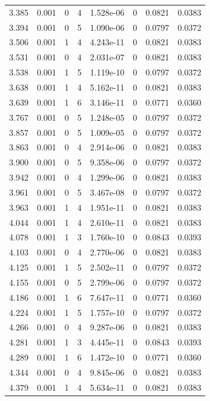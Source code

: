 \documentclass[preview]{standalone}
\begin{document}
{{{\begin{tabular}{L{1.2cm}C{1.2cm} C{0.3cm}C{0.5cm} C{1.4cm}C{1.4cm} C{1.4cm}C{1.4cm}}
  3.385  &  0.001  & 0     &  4 &  1.528e-06  & 0  & 0.0821 &  0.0383   \\ 
  3.394  &  0.001  & 0     &  5 &  1.090e-06  & 0  & 0.0797 &  0.0372   \\ 
  3.506  &  0.001  & 1     &  4 &  4.243e-11  & 0  & 0.0821 &  0.0383   \\ 
  3.531  &  0.001  & 0     &  4 &  2.031e-07  & 0  & 0.0821 &  0.0383   \\ 
  3.538  &  0.001  & 1     &  5 &  1.119e-10  & 0  & 0.0797 &  0.0372   \\ 
  3.638  &  0.001  & 1     &  4 &  5.162e-11  & 0  & 0.0821 &  0.0383   \\ 
  3.639  &  0.001  & 1     &  6 &  3.146e-11  & 0  & 0.0771 &  0.0360   \\ 
  3.767  &  0.001  & 0     &  5 &  1.248e-05  & 0  & 0.0797 &  0.0372   \\ 
  3.857  &  0.001  & 0     &  5 &  1.009e-05  & 0  & 0.0797 &  0.0372   \\ 
  3.863  &  0.001  & 0     &  4 &  2.914e-06  & 0  & 0.0821 &  0.0383   \\ 
  3.900  &  0.001  & 0     &  5 &  9.358e-06  & 0  & 0.0797 &  0.0372   \\ 
  3.942  &  0.001  & 0     &  4 &  1.299e-06  & 0  & 0.0821 &  0.0383   \\ 
  3.961  &  0.001  & 0     &  5 &  3.467e-08  & 0  & 0.0797 &  0.0372   \\ 
  3.963  &  0.001  & 1     &  4 &  1.951e-11  & 0  & 0.0821 &  0.0383   \\ 
  4.044  &  0.001  & 1     &  4 &  2.610e-11  & 0  & 0.0821 &  0.0383   \\ 
  4.078  &  0.001  & 1     &  3 &  1.760e-10  & 0  & 0.0843 &  0.0393   \\ 
  4.103  &  0.001  & 0     &  4 &  2.770e-06  & 0  & 0.0821 &  0.0383   \\ 
  4.125  &  0.001  & 1     &  5 &  2.502e-11  & 0  & 0.0797 &  0.0372   \\ 
  4.155  &  0.001  & 0     &  5 &  2.799e-06  & 0  & 0.0797 &  0.0372   \\ 
  4.186  &  0.001  & 1     &  6 &  7.647e-11  & 0  & 0.0771 &  0.0360   \\ 
  4.224  &  0.001  & 1     &  5 &  1.757e-10  & 0  & 0.0797 &  0.0372   \\ 
  4.266  &  0.001  & 0     &  4 &  9.287e-06  & 0  & 0.0821 &  0.0383   \\ 
  4.281  &  0.001  & 1     &  3 &  4.445e-11  & 0  & 0.0843 &  0.0393   \\ 
  4.289  &  0.001  & 1     &  6 &  1.472e-10  & 0  & 0.0771 &  0.0360   \\ 
  4.344  &  0.001  & 0     &  4 &  9.845e-06  & 0  & 0.0821 &  0.0383   \\ 
  4.379  &  0.001  & 1     &  4 &  5.634e-11  & 0  & 0.0821 &  0.0383   \\ 
\hline 
\end{tabular} 

}}}
\end{document}
